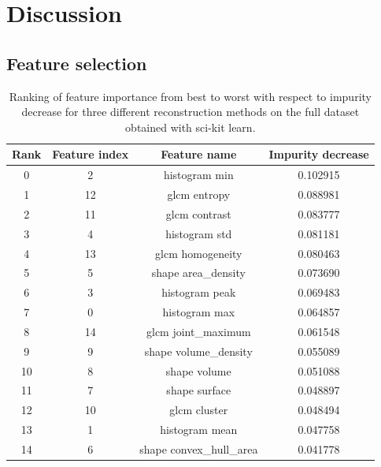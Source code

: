 \section{Discussion} \label{sec:discussion} 

\subsection{Feature selection}
\label{sec:Feature_selection}


\begin{table}[H]
    \centering
    \caption{Ranking of feature importance from best to worst with respect to
    impurity decrease for three different reconstruction methods on the full
    dataset obtained with sci-kit learn.}  
    \label{tab:feature_importance}  

    \begin{tabular}{|c|c|c|c|}
        \hline
        Rank & Feature index & Feature name & Impurity decrease \\     
        \hline
        0       & 2           & histogram min  & 0.102915  \\
        1      & 12            & glcm entropy  & 0.088981  \\
        2      & 11           & glcm contrast  & 0.083777  \\
        3       & 4           & histogram std  & 0.081181  \\
        4      & 13        & glcm homogeneity  & 0.080463  \\
        5       & 5      & shape area\_density  & 0.073690  \\
        6       & 3          & histogram peak  & 0.069483  \\
        7       & 0           & histogram max  & 0.064857  \\
        8      & 14      & glcm joint\_maximum  & 0.061548  \\
        9       & 9    & shape volume\_density  & 0.055089  \\
        10      & 8            & shape volume  & 0.051088  \\
        11      & 7           & shape surface  & 0.048897  \\
        12     & 10            & glcm cluster  & 0.048494  \\
        13      & 1          & histogram mean  & 0.047758  \\
        14      & 6  & shape convex\_hull\_area  & 0.041778  \\
        \hline
         
    \end{tabular} 
\end{table}


